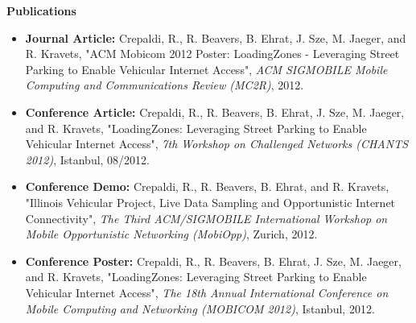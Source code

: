 \documentclass[letterpaper,11pt]{article}
\newcommand{\resitem}[1]{\item #1 \vspace{-2pt}}
\newcommand{\resheading}[1]{{\large \colorbox{mygrey}{\begin{minipage}{\textwidth}{\textbf{#1 \vphantom{p\^{E}}}}\end{minipage}}}}
\begin{document}
\newpage
\resheading{Publications}
\begin{itemize}
\resitem{\textbf{Journal Article:} Crepaldi, R., R. Beavers, B. Ehrat, J. Sze, M. Jaeger, and R. Kravets, "ACM Mobicom 2012 Poster: LoadingZones - Leveraging Street Parking to Enable Vehicular Internet Access", \emph{ACM SIGMOBILE Mobile Computing and Communications Review (MC2R)}, 2012.}
\resitem{\textbf{Conference Article:} Crepaldi, R., R. Beavers, B. Ehrat, J. Sze, M. Jaeger, and R. Kravets, "LoadingZones: Leveraging Street Parking to Enable Vehicular Internet Access", \emph{7th Workshop on Challenged Networks (CHANTS 2012)}, Istanbul, 08/2012.}
\resitem{\textbf{Conference Demo:} Crepaldi, R., R. Beavers, B. Ehrat, and R. Kravets, "Illinois Vehicular Project, Live Data Sampling and Opportunistic Internet Connectivity", \emph{The Third ACM/SIGMOBILE International Workshop on Mobile Opportunistic Networking (MobiOpp)}, Zurich, 2012.}
\resitem{\textbf{Conference Poster:} Crepaldi, R., R. Beavers, B. Ehrat, J. Sze, M. Jaeger, and R. Kravets, "LoadingZones: Leveraging Street Parking to Enable Vehicular Internet Access", \emph{The 18th Annual International Conference on Mobile Computing and Networking (MOBICOM 2012)}, Istanbul, 2012.}
\end{itemize}
\end{document}
